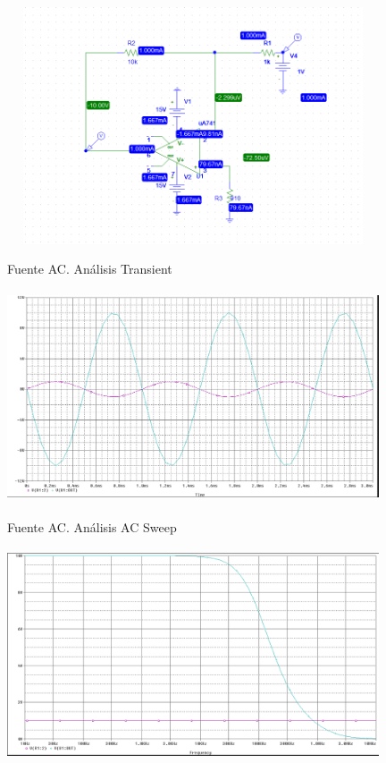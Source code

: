 \documentclass[12pt]{article}
\begin{document}
\begin{itemize}
		\includegraphics[width=11cm,height=7cm]{Img/opam_ua741_bias_analisis_DC}\\
		
		\newpage
		
		\noindent Fuente AC. Análisis Transient\\
		
		\includegraphics[width=11cm,height=7cm]{Img/opam_ua741_transient_AC}\\
		
		\noindent Fuente AC. Análisis AC Sweep\\
		
		\includegraphics[width=11cm,height=7cm]{Img/opam_ua741_AC_sweep}\\
		

\end{itemize}
\end{document}

